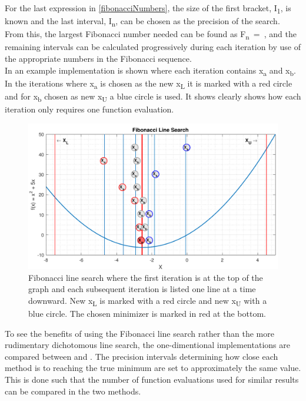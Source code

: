 For the last expression in \eqref{fibonacciNumbers}, the size of the first bracket, \si{I_1}, is known and the last interval, \si{I_n}, can be chosen as the precision of the search. From this, the largest Fibonacci number needed can be found as \si{F_n = }, and the remaining intervals can be calculated progressively during each iteration by use of the appropriate numbers in the Fibonacci sequence.\cite{AAntoniou}\\
In  an example implementation is shown where each iteration contains \si{x_a} and \si{x_b}. In the iterations where \si{x_a} is chosen as the new \si{x_{L}} it is marked with a red circle and for \si{x_b} chosen as new \si{x_{U}} a blue circle is used. It shows clearly shows how each iteration only requires one function evaluation.

\begin{figure}[H] 
	\centering
	\includegraphics[width=.8\textwidth]{figures/fibonacciLineSearchComprehension}
	\caption{Fibonacci line search where the first iteration is at the top of the graph and each subsequent iteration is listed one line at a time downward. New \si{x_{L}} is marked with a red circle and new \si{x_{U}} with a blue circle. The chosen minimizer is marked in red at the bottom.}
	\label{fibonacciLineSearchComprehensive}
\end{figure}

To see the benefits of using the Fibonacci line search rather than the more rudimentary dichotomous line search, the one-dimentional implementations are compared between  and . The precision intervals determining how close each method is to reaching the true minimum are set to approximately the same value. This is done such that the number of function evaluations used for similar results can be compared in the two methods.

